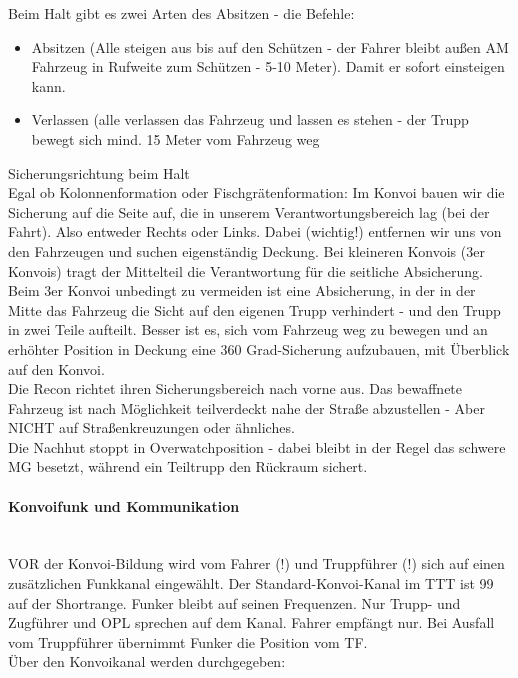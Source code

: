 Beim Halt gibt es zwei Arten des Absitzen - die Befehle:

	\begin{itemize}
		\item Absitzen (Alle steigen aus bis auf den Schützen - der Fahrer bleibt außen AM Fahrzeug in Rufweite zum Schützen - 5-10 Meter). Damit er sofort einsteigen kann.
		\item Verlassen (alle verlassen das Fahrzeug und lassen es stehen - der Trupp bewegt sich mind. 15 Meter vom Fahrzeug weg
	\end{itemize}

	Sicherungsrichtung beim Halt \\
Egal ob Kolonnenformation oder Fischgrätenformation: Im Konvoi bauen wir die Sicherung auf die Seite auf, die in unserem Verantwortungsbereich lag (bei der Fahrt). Also entweder Rechts oder Links. Dabei (wichtig!) entfernen wir uns von den Fahrzeugen und suchen eigenständig Deckung. Bei kleineren Konvois (3er Konvois) tragt der Mittelteil die Verantwortung für die seitliche Absicherung. Beim 3er Konvoi unbedingt zu vermeiden ist eine Absicherung, in der in der Mitte das Fahrzeug die Sicht auf den eigenen Trupp verhindert - und den Trupp in zwei Teile aufteilt. Besser ist es, sich vom Fahrzeug weg zu bewegen und an erhöhter Position in Deckung eine 360 Grad-Sicherung aufzubauen, mit Überblick auf den Konvoi. \\
	Die Recon richtet ihren Sicherungsbereich nach vorne aus. Das bewaffnete Fahrzeug ist nach Möglichkeit teilverdeckt nahe der Straße abzustellen - Aber NICHT auf Straßenkreuzungen oder ähnliches. \\
	Die Nachhut stoppt in Overwatchposition - dabei bleibt in der Regel das schwere MG besetzt, während ein Teiltrupp den Rückraum sichert. \\

\paragraph{Konvoifunk und Kommunikation} \ \\
	VOR der Konvoi-Bildung wird vom Fahrer (!) und Truppführer (!) sich auf einen zusätzlichen Funkkanal eingewählt. Der Standard-Konvoi-Kanal im TTT ist 99 auf der Shortrange. Funker bleibt auf seinen Frequenzen. Nur Trupp- und Zugführer und OPL sprechen auf dem Kanal. Fahrer empfängt nur. Bei Ausfall vom Truppführer übernimmt Funker die Position vom TF. \\
	Über den Konvoikanal werden durchgegeben:


